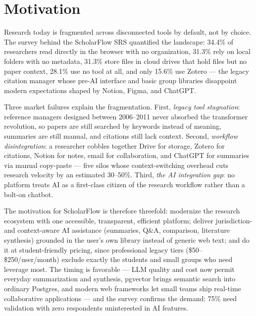 \section{Motivation}
Research today is fragmented across disconnected tools by default, not by
choice. The survey behind the ScholarFlow SRS quantified the landscape:
34.4\% of researchers read directly in the browser with no organization,
31.3\% rely on local folders with no metadata, 31.3\% store files in cloud
drives that hold files but no paper context, 28.1\% use no tool at all, and
only 15.6\% use Zotero --- the legacy citation manager whose pre-AI interface
and basic group libraries disappoint modern expectations shaped by Notion,
Figma, and ChatGPT.

Three market failures explain the fragmentation. First, \emph{legacy tool
stagnation}: reference managers designed between 2006--2011 never absorbed
the transformer revolution, so papers are still searched by keywords instead
of meaning, summaries are still manual, and citations still lack context.
Second, \emph{workflow disintegration}: a researcher cobbles together Drive
for storage, Zotero for citations, Notion for notes, email for collaboration,
and ChatGPT for summaries via manual copy-paste --- five silos whose
context-switching overhead cuts research velocity by an estimated 30--50\%.
Third, \emph{the AI integration gap}: no platform treats AI as a first-class
citizen of the research workflow rather than a bolt-on chatbot.

The motivation for ScholarFlow is therefore threefold: modernize the research
ecosystem with one accessible, transparent, efficient platform; deliver
jurisdiction- and context-aware AI assistance (summaries, Q\&A, comparison,
literature synthesis) grounded in the user's own library instead of generic
web text; and do it at student-friendly pricing, since professional legacy
tiers (\$50--\$250/user/month) exclude exactly the students and small groups
who need leverage most. The timing is favorable --- LLM quality and cost now
permit everyday summarization and synthesis, pgvector brings semantic search
into ordinary Postgres, and modern web frameworks let small teams ship
real-time collaborative applications --- and the survey confirms the demand:
75\% need validation with zero respondents uninterested in AI features.
